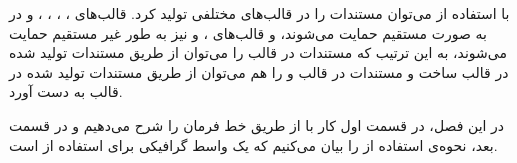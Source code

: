 با استفاده از   می‌توان مستندات را در قالب‌های مختلفی تولید کرد. قالب‌های 
، ، ، ،  و  
در  به صورت مستقیم حمایت می‌شوند، و قالب‌های 
،  و  
نیز به طور غیر مستقیم حمایت می‌شوند، به این ترتیب که مستندات در قالب  را می‌توان از طریق مستندات 
تولید شده در قالب  ساخت و مستندات در قالب  و  را هم می‌توان از طریق مستندات 
تولید شده در قالب  به دست آورد.


در این فصل، در قسمت اول کار با  از طریق خط فرمان را شرح می‌دهیم و در قسمت بعد، نحوه‌ی استفاده از  را 
بیان می‌کنیم که یک واسط گرافیکی برای استفاده از  است.